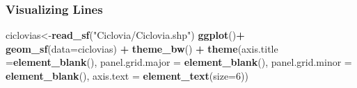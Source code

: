 \documentclass[
  shownotes,
  xcolor={svgnames},
  hyperref={colorlinks,citecolor=DarkBlue,linkcolor=DarkRed,urlcolor=DarkBlue}
   , aspectratio=169]{beamer}
\newenvironment{Shaded}{\begin{snugshade}}{\end{snugshade}}
\newcommand{\DataTypeTok}[1]{\textcolor[rgb]{0.13,0.29,0.53}{#1}}
\newcommand{\DecValTok}[1]{\textcolor[rgb]{0.00,0.00,0.81}{#1}}
\newcommand{\KeywordTok}[1]{\textcolor[rgb]{0.13,0.29,0.53}{\textbf{#1}}}
\newcommand{\NormalTok}[1]{#1}
\newcommand{\OperatorTok}[1]{\textcolor[rgb]{0.81,0.36,0.00}{\textbf{#1}}}
\newcommand{\StringTok}[1]{\textcolor[rgb]{0.31,0.60,0.02}{#1}}
\begin{document}
\begin{frame}[fragile]
\frametitle{Visualizing Lines}



\begin{minipage}[t]{0.52\linewidth}
        \begin{scriptsize}

\begin{Shaded}
\begin{Highlighting}[]
\NormalTok{ciclovias\textless{}{-}}\KeywordTok{read\_sf}\NormalTok{(}\StringTok{"Ciclovia/Ciclovia.shp"}\NormalTok{)}
\KeywordTok{ggplot}\NormalTok{()}\OperatorTok{+}
\StringTok{  }\KeywordTok{geom\_sf}\NormalTok{(}\DataTypeTok{data=}\NormalTok{ciclovias) }\OperatorTok{+}
\StringTok{  }\KeywordTok{theme\_bw}\NormalTok{() }\OperatorTok{+}
\StringTok{  }\KeywordTok{theme}\NormalTok{(}\DataTypeTok{axis.title =}\KeywordTok{element\_blank}\NormalTok{(),}
        \DataTypeTok{panel.grid.major =} \KeywordTok{element\_blank}\NormalTok{(),}
        \DataTypeTok{panel.grid.minor =} \KeywordTok{element\_blank}\NormalTok{(),}
        \DataTypeTok{axis.text =} \KeywordTok{element\_text}\NormalTok{(}\DataTypeTok{size=}\DecValTok{6}\NormalTok{))}
\end{Highlighting}
\end{Shaded}
   \end{scriptsize}
    \end{minipage}
    \hfill
    \begin{minipage}[t]{0.43\linewidth}%
        \begin{figure}[H] \centering
            \captionsetup{justification=centering}  


\end{figure}
\end{minipage}
\end{frame}
\end{document}
